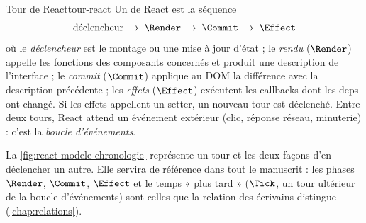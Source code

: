 \begin{definition}{Tour de React}{tour-react}
Un  de React est la séquence
\[
  \text{déclencheur} \;\to\; \Render \;\to\; \Commit \;\to\; \Effect
\]
où le \emph{déclencheur} est le montage ou une mise à jour d'état ; le
\emph{rendu} ($\Render$) appelle les fonctions des composants concernés et
produit une description de l'interface ; le \emph{commit} ($\Commit$) applique
au DOM la différence avec la description précédente ; les \emph{effets}
($\Effect$) exécutent les callbacks  dont les deps ont changé.
Si les effets appellent un setter, un nouveau tour est déclenché. Entre deux
tours, React attend un événement extérieur (clic, réponse réseau, minuterie) :
c'est la \emph{boucle d'événements}.
\end{definition}

La \cref{fig:react-modele-chronologie} représente un tour et les deux façons
d'en déclencher un autre. Elle servira de référence dans tout le manuscrit :
les phases $\Render$, $\Commit$, $\Effect$ et le temps « plus tard » ($\Tick$,
un tour ultérieur de la boucle d'événements) sont celles que la relation des
écrivains distingue (\cref{chap:relations}).

